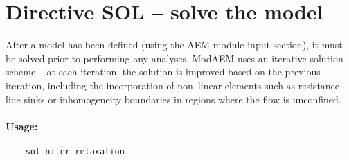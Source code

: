 \section{Directive SOL -- solve the model }

After a model has been defined (using the AEM module input section),
it must be solved prior to performing any analyses. ModAEM uses an
iterative solution scheme -- at each iteration, the solution is improved
based on the previous iteration, including the incorporation of non--linear
elements such as resistance line sinks or inhomogeneity boundaries
in regions where the flow is unconfined.

\paragraph{Usage:}
\begin{verbatim}
    sol niter relaxation
\end{verbatim}

